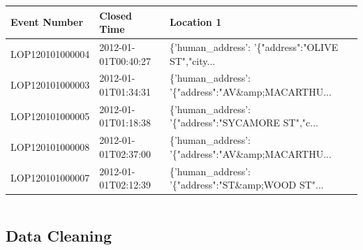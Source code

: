 \documentclass{article} %
\begin{document}
\begin{tabular}{|l|l|l|}
	\toprule
	Event Number &          Closed Time  &                                        Location 1 \\
	\midrule
	LOP120101000004 &  2012-01-01T00:40:27 &  \{'human\_address': '\{"address":"OLIVE ST","city... \\
	LOP120101000003 &  2012-01-01T01:34:31 &  \{'human\_address': '\{"address":"AV\&amp;MACARTHU... \\
	LOP120101000005 &  2012-01-01T01:18:38 &  \{'human\_address': '\{"address":"SYCAMORE ST","c... \\
	LOP120101000008 &  2012-01-01T02:37:00 &  \{'human\_address': '\{"address":"AV\&amp;MACARTHU... \\
	LOP120101000007 &  2012-01-01T02:12:39 &  \{'human\_address': '\{"address":"ST\&amp;WOOD ST"... \\
	\bottomrule
\end{tabular}

\[\]

\subsection{Data Cleaning}
\end{document}

